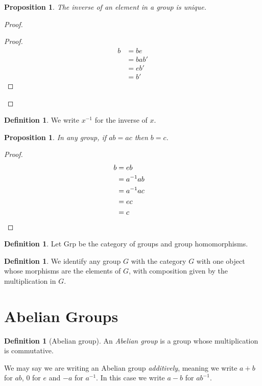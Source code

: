 \documentclass{book}
\let\qed\relax
\newtheorem{prop}[ax]{Proposition}
\theoremstyle{definition}
\newtheorem{df}[ax]{Definition}
\begin{document}
\begin{prop}
The inverse of an element in a group is unique.
\end{prop}

\begin{proof}
\pf
{}
\begin{proof}
	\pf
	\begin{align*}
		b & = be \\
		& = bab' \\
		& = eb' \\
		& = b'
	\end{align*}
\end{proof}
\qed
\end{proof}

\begin{df}
We write $x^{-1}$ for the inverse of $x$.
\end{df}

\begin{prop}
\label{prop:groupcancel}
In any group, if $ab = ac$ then $b = c$.
\end{prop}

\begin{proof}
\pf
\begin{align*}
b & = eb \\
& = a^{-1}ab \\
& = a^{-1}ac \\
& = ec \\
& = c & \qed
\end{align*}
\end{proof}

\begin{df}
Let $\mathrm{Grp}$ be the category of groups and group homomorphisms.
\end{df}

\begin{df}
We identify any group $G$ with the category $G$ with one object whose morphisms are the elements of $G$, with composition given by the multiplication in $G$.
\end{df}

\section{Abelian Groups}

\begin{df}[Abelian group]
An \emph{Abelian group} is a group whose multiplication is commutative.

We may say we are writing an Abelian group \emph{additively}, meaning we write $a + b$ for $ab$, $0$ for $e$ and $-a$ for $a^{-1}$. In this case we write $a-b$ for $ab^{-1}$.
\end{df}
\end{document}
